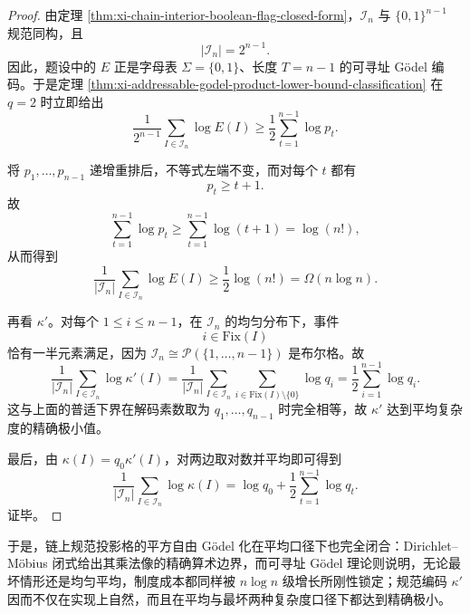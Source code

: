 \begin{proof}
由定理 \ref{thm:xi-chain-interior-boolean-flag-closed-form}，\(\mathcal I_n\) 与 \(\{0,1\}^{n-1}\) 规范同构，且
\[
|\mathcal I_n|=2^{n-1}.
\]
因此，题设中的 \(E\) 正是字母表 \(\Sigma=\{0,1\}\)、长度 \(T=n-1\) 的可寻址 Gödel 编码。于是定理 \ref{thm:xi-addressable-godel-product-lower-bound-classification} 在 \(q=2\) 时立即给出
\[
\frac{1}{2^{n-1}}
\sum_{I\in\mathcal I_n}\log E(I)
\ge
\frac12\sum_{t=1}^{n-1}\log p_t.
\]

将 \(p_1,\dots,p_{n-1}\) 递增重排后，不等式左端不变，而对每个 \(t\) 都有
\[
p_t\ge t+1.
\]
故
\[
\sum_{t=1}^{n-1}\log p_t
\ge
\sum_{t=1}^{n-1}\log(t+1)
=
\log(n!),
\]
从而得到
\[
\frac{1}{|\mathcal I_n|}
\sum_{I\in\mathcal I_n}\log E(I)
\ge
\frac12\log(n!)
=
\Omega(n\log n).
\]

再看 \(\kappa'\)。对每个 \(1\le i\le n-1\)，在 \(\mathcal I_n\) 的均匀分布下，事件
\[
i\in\mathrm{Fix}(I)
\]
恰有一半元素满足，因为 \(\mathcal I_n\cong \mathcal P(\{1,\dots,n-1\})\) 是布尔格。故
\[
\frac{1}{|\mathcal I_n|}
\sum_{I\in\mathcal I_n}\log \kappa'(I)
=
\frac{1}{|\mathcal I_n|}
\sum_{I\in\mathcal I_n}\sum_{i\in\mathrm{Fix}(I)\setminus\{0\}}\log q_i
=
\frac12\sum_{i=1}^{n-1}\log q_i.
\]
这与上面的普适下界在解码素数取为 \(q_1,\dots,q_{n-1}\) 时完全相等，故 \(\kappa'\) 达到平均复杂度的精确极小值。

最后，由 \(\kappa(I)=q_0\kappa'(I)\)，对两边取对数并平均即可得到
\[
\frac{1}{|\mathcal I_n|}
\sum_{I\in\mathcal I_n}\log \kappa(I)
=
\log q_0+\frac12\sum_{t=1}^{n-1}\log q_t.
\]
证毕。
\end{proof}

\noindent
于是，链上规范投影格的平方自由 Gödel 化在平均口径下也完全闭合：Dirichlet--Möbius 闭式给出其乘法像的精确算术边界，而可寻址 Gödel 理论则说明，无论最坏情形还是均匀平均，制度成本都同样被 \(n\log n\) 级增长所刚性锁定；规范编码 \(\kappa'\) 因而不仅在实现上自然，而且在平均与最坏两种复杂度口径下都达到精确极小。

\endinput
